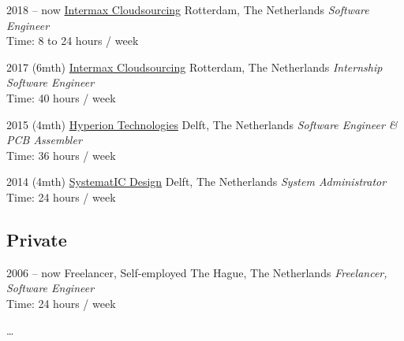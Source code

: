 \documentclass[]{friggeri-cv}
\begin{document}
\begin{entrylist}


\entry
{2018 -- now}
{\href{https://intermax.nl/}{Intermax Cloudsourcing}}
{Rotterdam, The Netherlands}
{\emph{Software Engineer} \\
Time: 8 to 24 hours / week}


\entry
{2017 (6mth)}
{\href{https://intermax.nl/}{Intermax Cloudsourcing}}
{Rotterdam, The Netherlands}
{\emph{Internship Software Engineer} \\
Time: 40 hours / week}


\entry
{2015 (4mth)}
{\href{https://hyperiontechnologies.nl/}{Hyperion Technologies}}
{Delft, The Netherlands}
{\emph{Software Engineer \& PCB Assembler} \\
Time: 36 hours / week}


\entry
{2014 (4mth)}
{\href{https://systemat-ic.com/}{SystematIC Design}}
{Delft, The Netherlands}
{\emph{System Administrator} \\
Time: 24 hours / week}


\end{entrylist}

\subsection{Private}

\begin{entrylist}


\entry
{2006 -- now}
{Freelancer, Self-employed}
{The Hague, The Netherlands}
{\emph{Freelancer, Software Engineer} \\
Time: 24 hours / week}


\end{entrylist}

\ldots{}

\newpage{}

\end{document}
